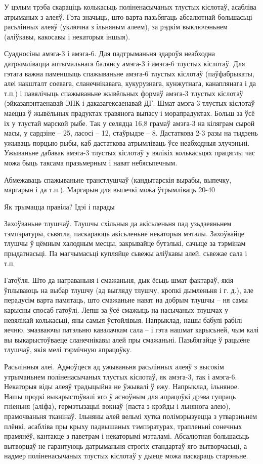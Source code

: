 У цэлым трэба скараціць колькасьць поліненасычаных тлустых кіслотаў, асабліва атрыманых з алеяў. Гэта значыць, што варта пазьбягаць абсалютнай большасьці расьлінных алеяў (уключна з ільняным алеем), за рэдкім выключэньнем (аліўкавы, какосавы і некаторыя іншыя).

Суадносіны амэга-3 і амэга-6.
Для падтрыманьня здароўя неабходна датрымлівацца аптымальнага балянсу амэга-3 і амэга-6 тлустых кіслотаў. Для гэтага важна паменшыць спажываньне амэга-6 тлустых кіслотаў (паўфабрыкаты, алеі накшталт соевага, сланечнікавага, кукурузнага, кунжутнага, канаплянага і да т.п.) і павялічыць спажываньне жывёльных формаў амэга-3 тлустых кіслотаў (эйказапэнтаенавай ЭПК і даказагексаенавай ДГ. Шмат амэга-3 тлустых кіслотаў маецца ў жывёльных прадуктах травянога выпасу і морапрадуктах. Больш за ўсё іх у тлустай марской рыбе. Так у селядца 16,8 грамаў амэга-3 на кіляграм сырой масы, у сардзіне – 25, ласосі – 12, стаўрыдзе – 8. Дастаткова 2-3 разы на тыдзень ужываць порцыю рыбы, каб дастаткова атрымліваць ўсе неабходныя злучэньні. Ужываньне дабавак амэга-3 тлустых кіслотаў у вялікіх колькасьцях працяглы час можа быць таксама празьмерным і нават небясьпечным.

Абмежаваць спажываньне транстлушчаў (кандытарскія вырабы, выпечку, маргарын і да т.п.).
Маргарын для выпечкі можа ўтрымліваць 20-40%

Як трымацца правіла? Ідэі і парады

Захоўваньне тлушчаў.
Тлушчы схільныя да акісьленьня пад узьдзеяньнем тэмпэратуры, сьвятла, паскараюць акісьленьне некаторыя мэталы. Захоўвайце тлушчы ў цёмным халодным месцы, закрывайце бутэлькі, сачыце за тэрмінам прыдатнасьці. Па магчымасьці купляйце сьвежы аліўкавы алей, сьвежае сала і т.п.

Гатоўля.
Што да награваньня і смажаньня, дык ёсьць шмат фактараў, якія ўплываюць на выбар тлушчу (ад выгляду тлушчу, кропкі дымленьня і г. д.), але перадусім варта памятаць, што смажаньне нават на добрым тлушчы – ня самы карысны спосаб гатоўлі. Лепш за ўсё смажыць на насычаных тлушчах у невялікай колькасьці, яны самыя ўстойлівыя. Напрыклад, нашы бабулі рабілі яечню, змазваючы патэльню кавалачкам сала – і гэта нашмат карысьней, чым калі вы выкарыстоўваеце сланечнікавы алей пры смажаньні. Пазьбягайце ў рацыёне тлушчаў, якія мелі тэрмічную апрацоўку.

Расьлінныя алеі.
Адмоўцеся ад ужываньня расьлінных алеяў з высокім утрыманьнем поліненасычаных тлустых кіслотаў, як амэга-3, так і амэга-6. Некаторыя віды алеяў традыцыйна не ўжывалі ў ежу. Напрыклад, ільняное. Нашы продкі выкарыстоўвалі яго ў асноўным для апрацоўкі дрэва супраць гніеньня (аліфа), гермэтызацыі вокнаў (паста з крэйды і льнянога алею), прамочваньня тканінаў. Ільняны алей вельмі хутка полімэрызуецца з утварэньнем плёнкі, асабліва пры крыху падвышаных тэмпэратурах, трапленьні сонечных прамянёў, кантакце з паветрам і некаторымі мэталамі. Абсалютная большасьць вытворцаў не гарантуюць датрыманьня строгіх стандартаў яго вытворчасьці, а надмер поліненасычаных тлустых кіслотаў у дыеце можа паскараць старэньне.

